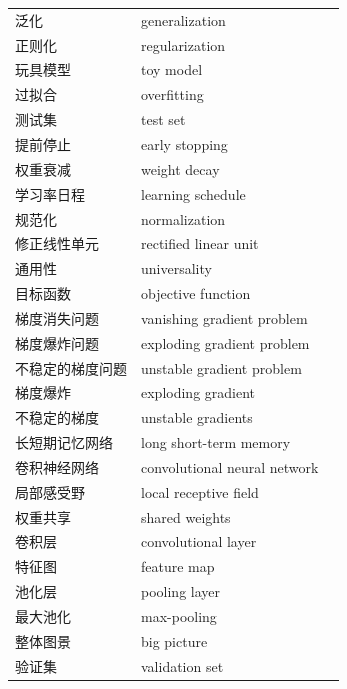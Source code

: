\begin{longtable}{p{}p{}r}
泛化 & generalization & \pageref{term:51} \\
正则化 & regularization & \pageref{term:52} \\
玩具模型 & toy model & \pageref{term:53} \\
过拟合 & overfitting & \pageref{term:54} \\
测试集 & test set & \pageref{term:55} \\
提前停止 & early stopping & \pageref{term:56} \\
权重衰减 & weight decay & \pageref{term:57} \\
学习率日程 & learning schedule & \pageref{term:58} \\
规范化 & normalization & \pageref{term:59} \\
修正线性单元 & rectified linear unit & \pageref{term:60} \\
通用性 & universality & \pageref{term:61} \\
目标函数 & objective function & \pageref{term:62} \\
梯度消失问题 & vanishing gradient problem & \pageref{term:63} \\
梯度爆炸问题 & exploding gradient problem & \pageref{term:64} \\
不稳定的梯度问题 & unstable gradient problem & \pageref{term:65} \\
梯度爆炸 & exploding gradient & \pageref{term:66} \\
不稳定的梯度 & unstable gradients & \pageref{term:67} \\
长短期记忆网络 & long short-term memory & \pageref{term:68} \\
卷积神经网络 & convolutional neural network & \pageref{term:69} \\
局部感受野 & local receptive field & \pageref{term:70} \\
权重共享 & shared weights & \pageref{term:71} \\
卷积层 & convolutional layer & \pageref{term:72} \\
特征图 & feature map & \pageref{term:73} \\
池化层 & pooling layer & \pageref{term:74} \\
最大池化 & max-pooling & \pageref{term:75} \\
整体图景 & big picture & \pageref{term:76} \\
验证集 & validation set & \pageref{term:77} \\
\end{longtable}
\endgroup

